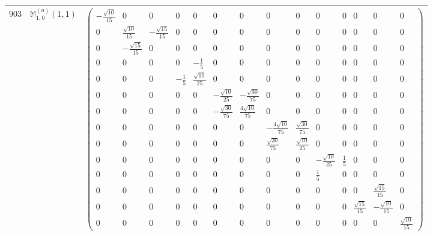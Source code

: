 \documentclass[fleqn,8pt,landscape]{jsarticle}
\begin{document}
\begin{center}
\begin{longtable}{ccc}
$ 903 $ & $ \mathbb{M}_{1,0}^{(a)}(1,1) $ & $ \begin{pmatrix} - \frac{\sqrt{10}}{15} & 0 & 0 & 0 & 0 & 0 & 0 & 0 & 0 & 0 & 0 & 0 & 0 & 0 \\ 0 & \frac{\sqrt{10}}{15} & - \frac{\sqrt{15}}{15} & 0 & 0 & 0 & 0 & 0 & 0 & 0 & 0 & 0 & 0 & 0 \\ 0 & - \frac{\sqrt{15}}{15} & 0 & 0 & 0 & 0 & 0 & 0 & 0 & 0 & 0 & 0 & 0 & 0 \\ 0 & 0 & 0 & 0 & - \frac{1}{5} & 0 & 0 & 0 & 0 & 0 & 0 & 0 & 0 & 0 \\ 0 & 0 & 0 & - \frac{1}{5} & \frac{\sqrt{10}}{25} & 0 & 0 & 0 & 0 & 0 & 0 & 0 & 0 & 0 \\ 0 & 0 & 0 & 0 & 0 & - \frac{\sqrt{10}}{25} & - \frac{\sqrt{30}}{75} & 0 & 0 & 0 & 0 & 0 & 0 & 0 \\ 0 & 0 & 0 & 0 & 0 & - \frac{\sqrt{30}}{75} & \frac{4 \sqrt{10}}{75} & 0 & 0 & 0 & 0 & 0 & 0 & 0 \\ 0 & 0 & 0 & 0 & 0 & 0 & 0 & - \frac{4 \sqrt{10}}{75} & \frac{\sqrt{30}}{75} & 0 & 0 & 0 & 0 & 0 \\ 0 & 0 & 0 & 0 & 0 & 0 & 0 & \frac{\sqrt{30}}{75} & \frac{\sqrt{10}}{25} & 0 & 0 & 0 & 0 & 0 \\ 0 & 0 & 0 & 0 & 0 & 0 & 0 & 0 & 0 & - \frac{\sqrt{10}}{25} & \frac{1}{5} & 0 & 0 & 0 \\ 0 & 0 & 0 & 0 & 0 & 0 & 0 & 0 & 0 & \frac{1}{5} & 0 & 0 & 0 & 0 \\ 0 & 0 & 0 & 0 & 0 & 0 & 0 & 0 & 0 & 0 & 0 & 0 & \frac{\sqrt{15}}{15} & 0 \\ 0 & 0 & 0 & 0 & 0 & 0 & 0 & 0 & 0 & 0 & 0 & \frac{\sqrt{15}}{15} & - \frac{\sqrt{10}}{15} & 0 \\ 0 & 0 & 0 & 0 & 0 & 0 & 0 & 0 & 0 & 0 & 0 & 0 & 0 & \frac{\sqrt{10}}{15} \end{pmatrix} $ \\ \hline

\end{longtable}
\end{center}
\end{document}
